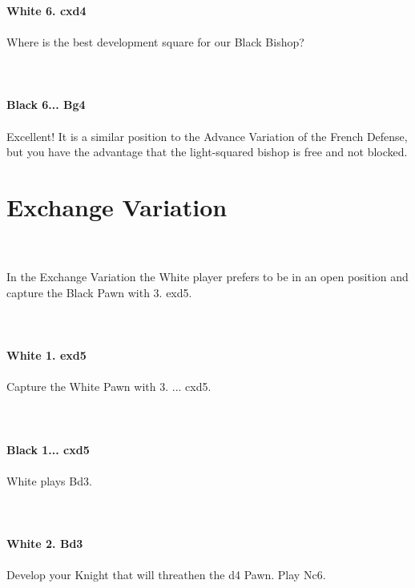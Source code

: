 \documentclass{article}
\begin{document}
\\

\\
\\
\textbf{White 6. cxd4}\\
\\
Where is the best development square for our Black Bishop?\\
\\

\\
\\
\textbf{Black 6... Bg4}\\
\\
Excellent! It is a similar position to the Advance Variation of the French Defense, but you have the advantage that the light-squared bishop is free and not blocked.\section{ Exchange Variation}

\\
\\
In the Exchange Variation the White player prefers to be in an open position and capture the Black Pawn with 3. exd5.\\
\\

\\
\\
\textbf{White 1. exd5}\\
\\
Capture the White Pawn with 3. ... cxd5.\\
\\

\\
\\
\textbf{Black 1... cxd5}\\
\\
White plays Bd3.\\
\\

\\
\\
\textbf{White 2. Bd3}\\
\\
Develop your Knight that will threathen the d4 Pawn. Play Nc6.\\
\\

\end{document}
